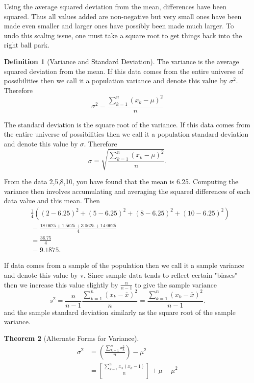 \documentclass[10pt,]{book}
\theoremstyle{plain}
\newtheorem{theorem}{Theorem}[section]
\theoremstyle{definition}
\newtheorem{definition}[theorem]{Definition}
\theoremstyle{definition}
\theoremstyle{definition}
\numberwithin{equation}{section}
\begin{document}
Using the average squared deviation from the mean, differences have been squared. Thus all values added are non-negative but very small ones have been made even smaller and larger ones have possibly been made much larger. To undo this scaling issue, one must take a square root to get things back into the right ball park. 
%
\begin{definition}[{Variance and Standard Deviation}]\label{definition-14}
The variance is the average squared deviation from the mean. If this data comes from the entire universe of possibilities then we call it a population variance and denote this value by \(\sigma^2\). Therefore
	\begin{equation*} \sigma^2 = \frac{\sum_{k=1}^n ( x_k-\mu )^2}{n} \end{equation*}
%
\par
The standard deviation is the square root of the variance. If this data comes from the entire universe of possibilities then we call it a population standard deviation and denote this value by \(\sigma\). Therefore
\begin{equation*} \sigma = \sqrt{\frac{\sum_{k=1}^n ( x_k-\mu )^2}{n}}.\end{equation*}
%
\par
From the data {2,5,8,10}, you have found that the mean is 6.25. Computing the variance then involves accumulating and averaging the squared differences of each data value and this mean. Then
\begin{align*}
& \frac{1}{4} \left ( (2-6.25)^2 + (5-6.25)^2 + (8-6.25)^2 + (10-6.25)^2 \right ) \\
& = \frac{18.0625 + 1.5625 + 3.0625 + 14.0625}{4} \\
& = \frac{36.75}{4}\\
& = 9.1875.
\end{align*}
\par

If data comes from a sample of the population then we call it a sample variance and denote this value by v. Since sample data tends to reflect certain "biases" then we increase this value slightly by \(\frac{n}{n-1}\) to give the sample variance
\begin{equation*}s^2 = \frac{n}{n-1}\frac{\sum_{k=1}^n ( x_k-\overline{x} )^2}{n} = \frac{\sum_{k=1}^n ( x_k-\overline{x} )^2}{n-1}.\end{equation*}
and the sample standard deviation similarly as the square root of the sample variance.
%
\end{definition}
\begin{theorem}[{Alternate Forms for Variance}]\label{theorem-7}
\begin{align*}
\sigma^2 & = \left ( \frac{\sum_{k=1}^n x_k^2 }{n} \right ) - \mu^2 \\
& = \left [ \frac{\sum_{k=1}^n x_k(x_k - 1)}{n} \right ] + \mu - \mu^2
\end{align*}\end{theorem}
\end{document}
